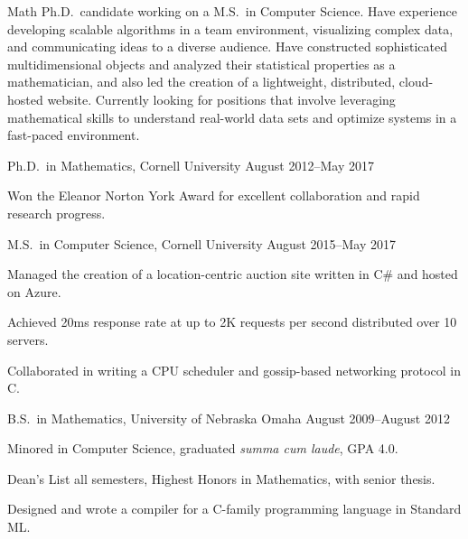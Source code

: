 \documentclass[11pt, letterpaper]{awesome-cv}
\begin{document}
\makecvheader






\begin{cvparagraph}
Math Ph.D.~candidate working on a M.S.~in Computer Science. 
Have experience developing scalable algorithms in a team environment, visualizing complex data, and communicating ideas to a diverse audience.
Have constructed sophisticated multidimensional objects and analyzed their statistical properties as a mathematician, and also led the creation of a lightweight, distributed, cloud-hosted website. 
Currently looking for positions that involve leveraging mathematical skills to understand real-world data sets and optimize systems in a fast-paced environment. 
\end{cvparagraph}






\begin{cventries}

\cventry
	{Ph.D.~in Mathematics, Cornell University}
	{}{}
	{August 2012--May 2017}
	{
		\begin{cvitems}
			\item{Won the Eleanor Norton York Award for excellent collaboration and rapid research progress.}
		\end{cvitems}
	}
	
\cventry
	{M.S.~in Computer Science, Cornell University}
	{}{}
	{August 2015--May 2017}
	{
		\begin{cvitems}
			\item{Managed the creation of a location-centric auction site written in C\# and hosted on Azure.}
			\item{Achieved 20ms response rate at up to 2K requests per second distributed over 10 servers.}
			\item{Collaborated in writing a CPU scheduler and gossip-based networking protocol in C.}
		\end{cvitems}
	}
	
\cventry
	{B.S.~in Mathematics, University of Nebraska Omaha}
	{}{}
	{August 2009--August 2012}
	{
		\begin{cvitems}
			\item{Minored in Computer Science, graduated \emph{summa cum laude}, GPA 4.0.}
			\item{Dean's List all semesters, Highest Honors in Mathematics, with senior thesis.}
			\item{Designed and wrote a compiler for a C-family programming language in Standard ML.}
		\end{cvitems}
	}
	
\end{cventries}
\end{document}
